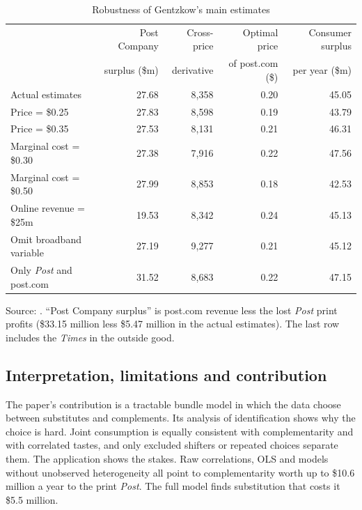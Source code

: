 \begin{table}[htbp]
\centering
\caption{Robustness of Gentzkow's main estimates}\label{tab:10-gentzkow-robust}
\small
\begin{tabular}{@{}lrrrr@{}}
\toprule
 & Post Company & Cross-price & Optimal price & Consumer surplus \\
 & surplus (\$m) & derivative & of post.com (\$) & per year (\$m) \\
\midrule
Actual estimates            & 27.68 & 8,358 & 0.20 & 45.05 \\
Price = \$0.25              & 27.83 & 8,598 & 0.19 & 43.79 \\
Price = \$0.35              & 27.53 & 8,131 & 0.21 & 46.31 \\
Marginal cost = \$0.30      & 27.38 & 7,916 & 0.22 & 47.56 \\
Marginal cost = \$0.50      & 27.99 & 8,853 & 0.18 & 42.53 \\
Online revenue = \$25m      & 19.53 & 8,342 & 0.24 & 45.13 \\
Omit broadband variable     & 27.19 & 9,277 & 0.21 & 45.12 \\
Only \textit{Post} and post.com & 31.52 & 8,683 & 0.22 & 47.15 \\
\bottomrule
\end{tabular}

\smallskip
\begin{minipage}{0.88\textwidth}
\footnotesize Source: \citet[Table~12]{Gentzkow2007}. ``Post Company surplus'' is post.com revenue less the lost
\textit{Post} print profits (\$33.15 million less \$5.47 million in the actual estimates). The last row includes the
\textit{Times} in the outside good.
\end{minipage}
\end{table}

\subsection{Interpretation, limitations and contribution}\label{sec:10-gentzkow-assess}

The paper's contribution is a tractable bundle model in which the data choose between substitutes and complements. Its
analysis of identification shows why the choice is hard. Joint consumption is equally consistent with complementarity
and with correlated tastes, and only excluded shifters or repeated choices separate them. The application shows the
stakes. Raw correlations, OLS and models without unobserved heterogeneity all point to complementarity worth up to
\$10.6 million a year to the print \textit{Post}. The full model finds substitution that costs it \$5.5 million.

